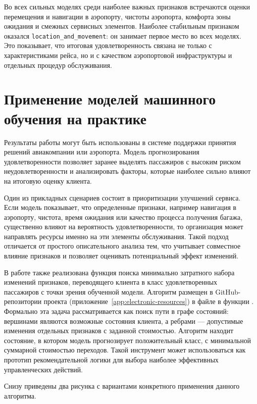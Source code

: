 \documentclass[14pt,a4paper]{extreport}
\begin{document}
Во всех сильных моделях среди наиболее важных признаков встречаются оценки перемещения и навигации в аэропорту, чистоты аэропорта, комфорта зоны ожидания и смежных сервисных элементов. Наиболее стабильным признаком оказался \texttt{location\_and\_movement}: он занимает первое место во всех моделях. Это показывает, что итоговая удовлетворенность связана не только с характеристиками рейса, но и с качеством аэропортовой инфраструктуры и отдельных процедур обслуживания.

\chapter{Применение моделей машинного обучения на практике}
Результаты работы могут быть использованы в системе поддержки принятия решений авиакомпании или аэропорта. Модель прогнозирования удовлетворенности позволяет заранее выделять пассажиров с высоким риском неудовлетворенности и анализировать факторы, которые наиболее сильно влияют на итоговую оценку клиента.

Один из прикладных сценариев состоит в приоритизации улучшений сервиса. Если модель показывает, что определенные признаки, например навигация в аэропорту, чистота, время ожидания или качество процесса получения багажа, существенно влияют на вероятность удовлетворенности, то организация может направлять ресурсы именно на эти элементы обслуживания. Такой подход отличается от простого описательного анализа тем, что учитывает совместное влияние признаков и позволяет оценивать потенциальный эффект изменений.

В работе также реализована функция поиска минимально затратного набора изменений признаков, переводящего клиента в класс удовлетворенных пассажиров с точки зрения обученной модели. Алгоритм размещен в GitHub-репозитории проекта (приложение~\ref{app:electronic-resources}) в файле  в функции . Формально эта задача рассматривается как поиск пути в графе состояний: вершинами являются возможные состояния клиента, а ребрами --- допустимые изменения отдельных признаков с заданной стоимостью. Алгоритм находит состояние, в котором модель прогнозирует положительный класс, с минимальной суммарной стоимостью переходов. Такой инструмент может использоваться как прототип рекомендательной логики для выбора наиболее эффективных управленческих действий.

Снизу приведены два рисунка с вариантами конкретного применения данного алгоритма.
\end{document}
